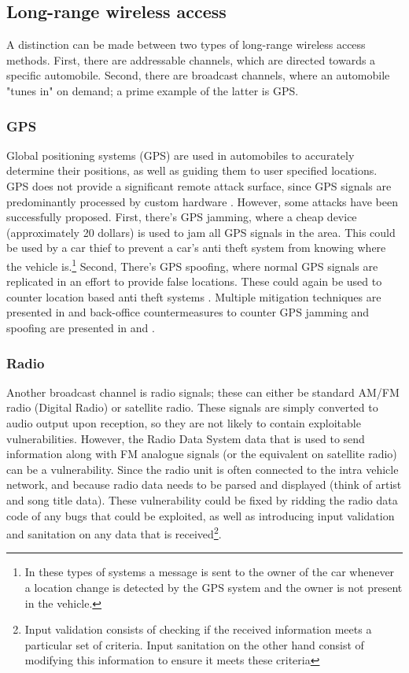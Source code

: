 \subsection{Long-range wireless access}
\label{subsec:lone-range_wireless_access}

A distinction can be made between two types of long-range wireless access methods. First, there are addressable channels, which are directed towards a specific automobile. Second, there are broadcast channels, where an automobile "tunes in" on demand; a prime example of the latter is GPS.

\subsubsection{GPS} 
\label{subsubsec:gps}

Global positioning systems (GPS) are used in automobiles to accurately determine their positions, as well as guiding them to user specified locations. GPS does not provide a significant remote attack surface, since GPS signals are predominantly processed by custom hardware \cite{Kosher}. However, some attacks have been successfully proposed. First, there's GPS jamming, where a cheap device (approximately 20 dollars) is used to jam all GPS signals in the area. This could be used by a car thief to prevent a car's anti theft system from knowing where the vehicle is.\footnote{In these types  of systems a message is sent to the owner of the car whenever a location change is detected by the GPS system and the owner is not present in the vehicle.} Second, There's GPS spoofing, where normal GPS signals are replicated in an effort to provide false locations. These could again be used to counter location based anti theft systems \cite{Petit}. Multiple mitigation techniques are presented in \cite{GPS1} and back-office countermeasures to counter GPS jamming and spoofing are presented in \cite{GPS2} and \cite{GPS3}. 

\subsubsection{Radio} 
\label{subsubsec:radio}

Another broadcast channel is radio signals; these can either be standard AM/FM radio (Digital Radio) or satellite radio. These signals are simply converted to audio output upon reception, so they are not likely to contain exploitable vulnerabilities. However, the Radio Data System data that is used to send information along with FM analogue signals (or the equivalent on satellite radio) can be a vulnerability. Since the radio unit is often connected to the intra vehicle network, and because radio data needs to be parsed and displayed (think of artist and song title data). These vulnerability could be fixed by ridding the radio data code of any bugs that could be exploited, as well as introducing input validation and sanitation on any data that is received\footnote{Input validation consists of checking if the received information meets a particular set of criteria. Input sanitation on the other hand consist of modifying this information to ensure it meets these criteria}. \cite{MillerA, MillerD, Kosher} 

